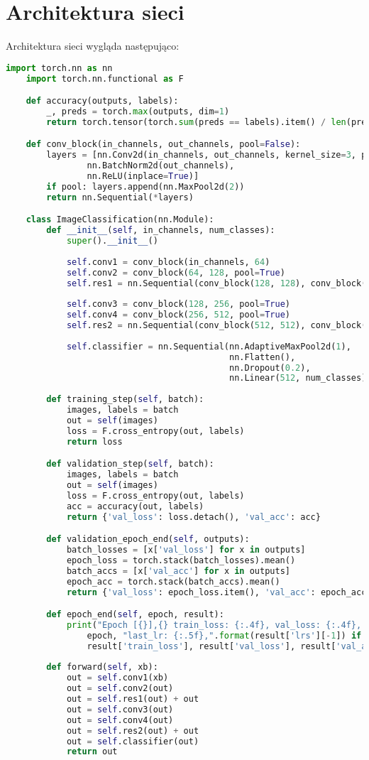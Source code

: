 \documentclass[11pt]{article}
\begin{document}
	\section{Architektura sieci}
	Architektura sieci wygląda następująco:

	\begin{lstlisting}[language=Python, caption={Implementacja w języku Python},captionpos=b]
	import torch.nn as nn
	import torch.nn.functional as F

	def accuracy(outputs, labels):
		_, preds = torch.max(outputs, dim=1)
		return torch.tensor(torch.sum(preds == labels).item() / len(preds))

	def conv_block(in_channels, out_channels, pool=False):
		layers = [nn.Conv2d(in_channels, out_channels, kernel_size=3, padding=1), 
				nn.BatchNorm2d(out_channels), 
				nn.ReLU(inplace=True)]
		if pool: layers.append(nn.MaxPool2d(2))
		return nn.Sequential(*layers)

	class ImageClassification(nn.Module):
		def __init__(self, in_channels, num_classes):
			super().__init__()
			
			self.conv1 = conv_block(in_channels, 64)
			self.conv2 = conv_block(64, 128, pool=True)   
			self.res1 = nn.Sequential(conv_block(128, 128), conv_block(128, 128))
			
			self.conv3 = conv_block(128, 256, pool=True)
			self.conv4 = conv_block(256, 512, pool=True)    
			self.res2 = nn.Sequential(conv_block(512, 512), conv_block(512, 512))   
			
			self.classifier = nn.Sequential(nn.AdaptiveMaxPool2d(1),
											nn.Flatten(),     
											nn.Dropout(0.2),
											nn.Linear(512, num_classes))    
			
		def training_step(self, batch):
			images, labels = batch
			out = self(images)
			loss = F.cross_entropy(out, labels)
			return loss

		def validation_step(self, batch):
			images, labels = batch
			out = self(images)
			loss = F.cross_entropy(out, labels)
			acc = accuracy(out, labels)
			return {'val_loss': loss.detach(), 'val_acc': acc}

		def validation_epoch_end(self, outputs):
			batch_losses = [x['val_loss'] for x in outputs]
			epoch_loss = torch.stack(batch_losses).mean()
			batch_accs = [x['val_acc'] for x in outputs]
			epoch_acc = torch.stack(batch_accs).mean()
			return {'val_loss': epoch_loss.item(), 'val_acc': epoch_acc.item()}

		def epoch_end(self, epoch, result):
			print("Epoch [{}],{} train_loss: {:.4f}, val_loss: {:.4f}, val_acc: {:.4f}".format(
				epoch, "last_lr: {:.5f},".format(result['lrs'][-1]) if 'lrs' in result else '', 
				result['train_loss'], result['val_loss'], result['val_acc']))
			
		def forward(self, xb):
			out = self.conv1(xb)
			out = self.conv2(out)
			out = self.res1(out) + out
			out = self.conv3(out)
			out = self.conv4(out)
			out = self.res2(out) + out
			out = self.classifier(out)
			return out
	\end{lstlisting}
\end{document}
